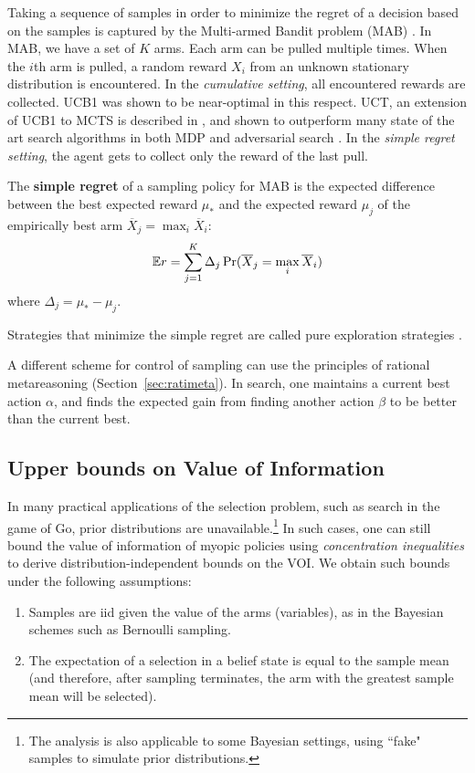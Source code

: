 Taking a sequence of samples in order to minimize the regret of a
decision based on the samples is captured by the Multi-armed Bandit
problem (MAB) \cite{Vermorel.bandits}. In MAB, we have a set of $K$
arms. Each arm can be pulled multiple times. When the $i$th arm is
pulled, a random reward $X_i$ from an unknown stationary distribution
is encountered. In the \textit{cumulative setting}, all encountered rewards are
collected.  UCB1 \cite{Auer.ucb} was shown to be
near-optimal in this respect. UCT, an extension of UCB1 to MCTS is
described in \cite{Kocsis.uct}, and shown to outperform many state of
the art search algorithms in both MDP and adversarial search
\cite{Gelly.mogo,Eyerich.ctp}. In the \textit{simple regret setting}, the agent
gets to collect only the reward of the last pull.
\begin{dfn}
The \textbf{simple regret} of a sampling policy for MAB
is the expected difference between the best expected reward
$\mu_*$ and the expected reward $\mu_j$ of the empirically best arm
$\overline X_j=\max_i\overline X_i$:
\begin{equation}
\mathbb{E} r=\sum_{j=1}^K\Delta_j\Pr(\overline X_j=\max_i\overline X_i)
\label{eqn:mcts-simple-regret}
\end{equation}
where $\Delta_j=\mu_*-\mu_j$.
\end{dfn}
Strategies that minimize the simple regret are called pure exploration
strategies \cite{Bubeck.pure}. 

A different scheme for control of sampling can use the principles of
rational metareasoning (Section~\ref{sec:ratimeta}).  In search, one
maintains a current best action $\alpha$, and finds the expected gain
from finding another action $\beta $ to be better than the current
best.

\subsection{Upper bounds on Value of Information}
\label{sec:mcts-approx-nonbayesian-section}

In many practical applications of the selection problem, such as search in
the game of Go, prior distributions are unavailable.\footnote{The analysis is also applicable to
some Bayesian settings, using ``fake" samples to simulate prior distributions.}
In such cases, one can still bound
the value of information of myopic policies using {\em concentration
inequalities} to derive distribution-independent bounds on the
VOI. We obtain such bounds under the
following assumptions:
\begin{enumerate}
\item Samples are iid given the value of the arms (variables), as in the Bayesian schemes such as Bernoulli
sampling.
\item The expectation of a selection in a belief state is equal to the sample mean (and therefore,
   after sampling terminates, the arm with the greatest sample mean will be selected).
\end{enumerate}

